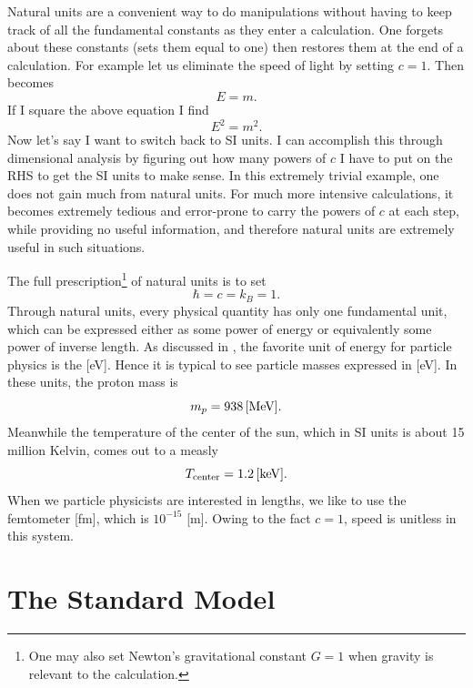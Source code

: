 Natural units are a convenient way to do manipulations without having to keep
track of all the fundamental constants as they enter a calculation. One forgets 
about these constants (sets them equal to one) then restores
them at the end of a calculation. For example let us eliminate the speed of light
by setting $c=1$. Then  becomes
\begin{equation}\label{eq:massEnergyNatural}
E=m.
\end{equation}
If I square the above equation I find
\begin{equation}
E^2=m^2.
\end{equation}
Now let's say I want to switch back to SI units. I can accomplish this through
dimensional analysis by figuring out how many powers of $c$ I have to put on
the RHS to get the SI units to make sense. In this extremely trivial example,
one does not gain much from natural units. For much more intensive calculations,
it becomes extremely tedious and error-prone to carry the powers of $c$ at each
step, while providing no useful information, and therefore natural units are
extremely useful in such situations.

The full prescription\footnote{One may also set Newton's gravitational constant
$G=1$ when gravity is relevant to the calculation.} of natural units is to set
\begin{equation}
\hbar=c=k_B=1.
\end{equation}
Through natural units, every physical quantity has only one fundamental unit,
which can be expressed either as some power of
energy or equivalently some power of inverse length. As discussed in
, the favorite unit of energy for particle physics is the [eV].
Hence it is typical to see particle masses expressed in [eV]. In these units,
the proton mass is
\begin{equation}\label{eq:massp}
m_p=938\,[\text{MeV}].
\end{equation}
Meanwhile the temperature of the center of the sun, which in SI units is about
15 million Kelvin, comes out to a measly
\begin{equation}\label{eq:Tsun}
T_{\text{center}}=1.2\,[\text{keV}].
\end{equation}
When we particle physicists are interested in lengths, we like to use
the femtometer [fm], which is $10^{-15}$ [m]. Owing to the fact $c=1$, speed is
unitless in this system.


\section{The Standard Model}\label{sec:SM}

